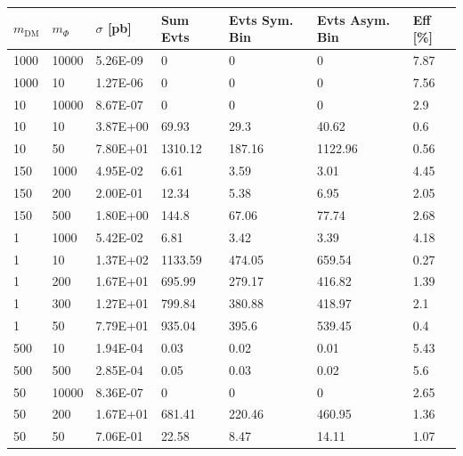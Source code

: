 \begin{table}[h!]
\small
\centering
\begin{tabular}{lllllll}
\hline
$m_\textrm{DM}$ & $m_\Phi$             & $\sigma$ [pb] & Sum Evts       & Evts Sym. Bin & Evts Asym. Bin & Eff  [\%]   \\\hline
1000  & 10000 & 5.26E-09 & 0       & 0      & 0       & 7.87 \\
1000  & 10    & 1.27E-06 & 0       & 0      & 0       & 7.56 \\
10  & 10000   & 8.67E-07 & 0       & 0      & 0       & 2.9  \\
10  & 10      & 3.87E+00 & 69.93   & 29.3   & 40.62   & 0.6  \\
10  & 50      & 7.80E+01 & 1310.12 & 187.16 & 1122.96 & 0.56 \\
150  & 1000   & 4.95E-02 & 6.61    & 3.59   & 3.01    & 4.45 \\
150  & 200    & 2.00E-01 & 12.34   & 5.38   & 6.95    & 2.05 \\
150  & 500    & 1.80E+00 & 144.8   & 67.06  & 77.74   & 2.68 \\
1  & 1000     & 5.42E-02 & 6.81    & 3.42   & 3.39    & 4.18 \\
1  & 10       & 1.37E+02 & 1133.59 & 474.05 & 659.54  & 0.27 \\
1  & 200      & 1.67E+01 & 695.99  & 279.17 & 416.82  & 1.39 \\
1  & 300      & 1.27E+01 & 799.84  & 380.88 & 418.97  & 2.1  \\
1  & 50       & 7.79E+01 & 935.04  & 395.6  & 539.45  & 0.4  \\
500  & 10     & 1.94E-04 & 0.03    & 0.02   & 0.01    & 5.43 \\
500  & 500    & 2.85E-04 & 0.05    & 0.03   & 0.02    & 5.6  \\
50  & 10000   & 8.36E-07 & 0       & 0      & 0       & 2.65 \\
50  & 200     & 1.67E+01 & 681.41  & 220.46 & 460.95  & 1.36 \\
50  & 50      & 7.06E-01 & 22.58   & 8.47   & 14.11   & 1.07\\

\end{tabular}
\end{table}
